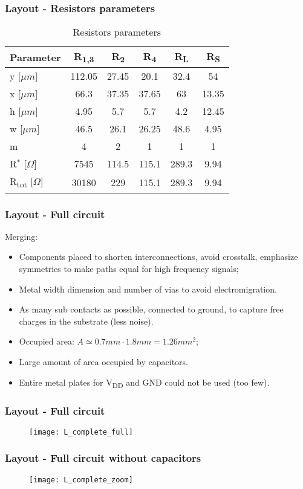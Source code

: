 \begin{frame}
	\frametitle{Layout - Resistors parameters}
	\begin{table} [h]
		\label{tab:specs}
		\caption{Resistors parameters}
		\centering	
		\begin{tabular}{lccccc} 
			\toprule 
			Parameter & R\textsubscript{1,3}& R\textsubscript{2} & R\textsubscript{4}&R\textsubscript{L}&R\textsubscript{S} \\ 
			\midrule
			y [$\mu m$] &112.05&27.45&20.1&32.4&54\\
			x [$\mu m$] &66.3&37.35&37.65&63&13.35\\
			h [$\mu m$] &4.95&5.7&5.7&4.2&12.45\\
			w [$\mu m$] &46.5&26.1&26.25&48.6&4.95\\
			m			&4&2&1&1&1\\
			R$^*$ [$\Omega$] & 7545&114.5&115.1&289.3&9.94\\
			R\textsubscript{tot} [$\Omega$]&30180&229&115.1&289.3&9.94\\
			\bottomrule 
		\end{tabular}	
	\end{table}

\end{frame}

\begin{frame}
	\frametitle{Layout - Full circuit}
	Merging:
	\begin{itemize}
		\item Components placed to shorten interconnections, avoid crosstalk, emphasize symmetries to make paths equal for high frequency signals;
		\item Metal width dimension and number of vias to avoid electromigration.
		\item As many sub contacts as possible, connected to ground, to capture free charges in the substrate (less noise).
		\item Occupied area: $A\simeq0.7mm \cdot 1.8mm = 1.26 mm^2$;
		\item Large amount of area occupied by capacitors.
		\item Entire metal plates for V\textsubscript{DD} and GND could not be used (too few).
	\end{itemize}
\end{frame}

\begin{frame}
	\frametitle{Layout - Full circuit}
	\begin{figure}[H]
		\centering
		\texttt{[image: L\_complete\_full]}
		\label{L_complete_full}
	\end{figure}
\end{frame}

\begin{frame}
	\frametitle{Layout - Full circuit without capacitors}
	\begin{figure}[H]
		\centering
		\texttt{[image: L\_complete\_zoom]}
		\label{L_complete_zoom}
	\end{figure}
\end{frame}
